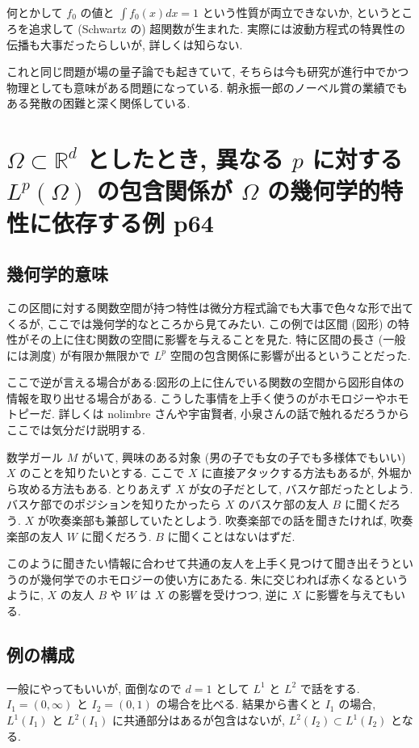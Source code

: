 \documentclass[openany, a4paper, oneside]{book}
\theoremstyle{break}
\theoremstyle{breakdefn}
\begin{document}
何とかして $f_0$ の値と $\int f_0 (x) dx = 1$ という性質が両立できないか, というところを追求して (Schwartz の) 超関数が生まれた.
実際には波動方程式の特異性の伝播も大事だったらしいが, 詳しくは知らない.

これと同じ問題が場の量子論でも起きていて, そちらは今も研究が進行中でかつ物理としても意味がある問題になっている.
朝永振一郎のノーベル賞の業績でもある発散の困難と深く関係している.
\section{$\Omega \subset \mathbb{R}^d$ としたとき, 異なる $p$ に対する $L^p (\Omega)$ の包含関係が $\Omega$ の幾何学的特性に依存する例 \cite{DavidWilliams1} p64}
\label{sec-11-3-9}
\subsection{幾何学的意味}
\label{sec-11-3-9-1}

この区間に対する関数空間が持つ特性は微分方程式論でも大事で色々な形で出てくるが, ここでは幾何学的なところから見てみたい.
この例では区間 (図形) の特性がその上に住む関数の空間に影響を与えることを見た.
特に区間の長さ (一般には測度) が有限か無限かで $L^p$ 空間の包含関係に影響が出るということだった.

ここで逆が言える場合がある:図形の上に住んでいる関数の空間から図形自体の情報を取り出せる場合がある.
こうした事情を上手く使うのがホモロジーやホモトピーだ.
詳しくは nolimbre さんや宇宙賢者, 小泉さんの話で触れるだろうからここでは気分だけ説明する.

数学ガール $M$ がいて, 興味のある対象 (男の子でも女の子でも多様体でもいい) $X$ のことを知りたいとする.
ここで $X$ に直接アタックする方法もあるが, 外堀から攻める方法もある.
とりあえず $X$ が女の子だとして, バスケ部だったとしよう.
バスケ部でのポジションを知りたかったら $X$ のバスケ部の友人 $B$ に聞くだろう.
$X$ が吹奏楽部も兼部していたとしよう.
吹奏楽部での話を聞きたければ, 吹奏楽部の友人 $W$ に聞くだろう.
$B$ に聞くことはないはずだ.

このように聞きたい情報に合わせて共通の友人を上手く見つけて聞き出そうというのが幾何学でのホモロジーの使い方にあたる.
朱に交じわれば赤くなるというように, $X$ の友人 $B$ や $W$ は $X$ の影響を受けつつ, 逆に $X$ に影響を与えてもいる.
\subsection{例の構成}
\label{sec-11-3-9-2}

一般にやってもいいが, 面倒なので $d = 1$ として $L^1$ と $L^2$ で話をする.
$I_1 = (0, \infty)$ と $I_2 = (0, 1)$ の場合を比べる.
結果から書くと $I_1$ の場合, $L^1 (I_1)$ と $L^2 (I_1)$ に共通部分はあるが包含はないが, $L^2 (I_2) \subset L^1 (I_2)$ となる.
\end{document}
